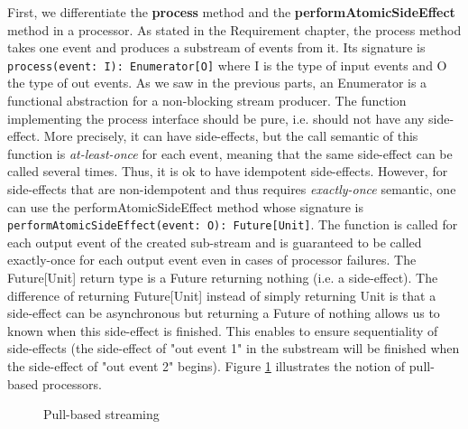 First, we differentiate the \textbf{process} method and the \textbf{performAtomicSideEffect} method in a processor. As stated in the Requirement chapter, the process method 
takes one event and produces a substream of events from it. Its signature is \verb|process(event: I): Enumerator[O]| where I is the type of input events and O the type
of out events. As we saw in the previous parts, an Enumerator is a functional abstraction for a non-blocking stream producer. The function implementing the process interface
should be pure, i.e. should not have any side-effect. More precisely, it can have side-effects, but the call semantic of this function is \textit{at-least-once} for each 
event, meaning that the same side-effect can be called several times. Thus, it is ok to have idempotent side-effects. However, for side-effects that are non-idempotent and
thus requires \textit{exactly-once} semantic, one can use the performAtomicSideEffect method whose signature is \verb|performAtomicSideEffect(event: O): Future[Unit]|.
The function is called for each output event of the created sub-stream and is guaranteed to be called exactly-once for each output event even in cases of processor failures. The
Future[Unit] return type is a Future returning nothing (i.e. a side-effect). The difference of returning Future[Unit] instead of simply returning Unit is that a side-effect
can be asynchronous but returning a Future of nothing allows us to known when this side-effect is finished. This enables to ensure sequentiality of side-effects (the side-effect
of "out event 1" in the substream will be finished when the side-effect of "out event 2" begins). Figure \ref{fig:pull_processors} illustrates the notion of pull-based processors.

\begin{figure}[h]
  \begin{center} 
    \caption{Pull-based streaming}
    \label{fig:pull_processors}
  \end{center}
\end{figure}

